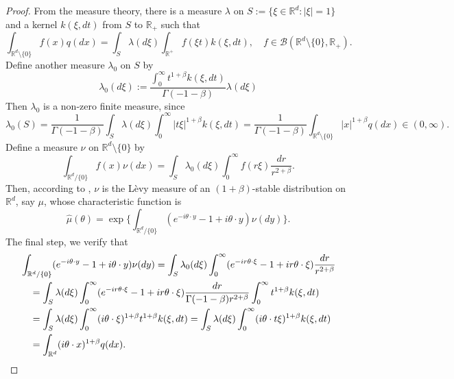 \documentclass[12pt]{amsart}
\theoremstyle{plain}
\theoremstyle{definition}
\numberwithin{equation}{section}
\begin{document}
\begin{proof}
    From the measure theory, there is a measure $\lambda$ on $S:= \{\xi\in \mathbb R^d:|\xi| = 1\}$ and a kernel $k(\xi,dt)$ from $S$ to $\mathbb R_+$ such that
\[
    \int_{\mathbb R^d\setminus \{0\}} f(x)q(dx) = \int_S \lambda(d\xi) \int_{\mathbb R^+} f(\xi t)k(\xi,dt),\quad
    f\in \mathcal B(\mathbb R^d\setminus \{0\}, \mathbb R_+).
\]
    Define another measure $\lambda_0$ on $S$ by
\[
    \lambda_0(d\xi) := \frac{\int_0^\infty t^{1+\beta}k(\xi,dt)}{\Gamma(-1-\beta)} \lambda (d\xi)
\]
    Then $\lambda_0$ is a non-zero finite measure, since
\[
    \lambda_0(S) = \frac{1}{\Gamma(-1-\beta)} \int_S \lambda (d\xi) \int_0^\infty |t\xi|^{1+\beta}k(\xi,dt)
    = \frac{1}{\Gamma(-1-\beta)} \int_{\mathbb R^d\setminus\{0\}} |x|^{1+\beta} q(dx) \in (0,\infty).
\]
    Define a measure $\nu$ on $\mathbb R^d\setminus\{0\}$ by
\[
    \int_{\mathbb R^d/\{0\}}f(x)\nu(dx)= \int_{S} \lambda_0(d\xi) \int_0^\infty f(r\xi) \frac{dr}{r^{2+\beta}} .
\]
    Then, according to \cite[Remark 14.4]{Sato1999Levy}, $\nu$ is the L\`evy measure of an $(1+\beta)$-stable distribution on $\mathbb R^d$, say $\mu$, whose characteristic function is \[\hat \mu(\theta)=\exp\Big\{\int_{\mathbb R^d/\{0\}} (e^{-i\theta \cdot y}-1+i\theta \cdot y) \nu(dy)\Big\}.\]
    The final step, we verify that
\begin{align}
    &\int_{\mathbb R^d/\{0\}} (e^{-i\theta \cdot y}-1+i\theta \cdot y) \nu(dy)
    = \int_S \lambda_0(d\xi) \int_0^\infty (e^{-ir\theta \cdot \xi}-1+ir\theta \cdot \xi) \frac{dr}{r^{2+\beta}}
\\&\quad = \int_S \lambda (d\xi) \int_0^\infty (e^{-ir\theta \cdot \xi}-1+ir\theta \cdot \xi) \frac{dr}{\Gamma(-1-\beta)r^{2+\beta}}\int_0^\infty t^{1+\beta} k(\xi,dt)
\\&\quad = \int_S \lambda (d\xi) \int_0^\infty (i\theta\cdot \xi)^{1+\beta} t^{1+\beta} k(\xi,dt)
= \int_S \lambda(d\xi) \int_0^\infty (i\theta \cdot t\xi)^{1+\beta} k(\xi,dt)
\\&\quad = \int_{\mathbb R^d} (i\theta \cdot x)^{1+\beta} q(dx).
\qedhere
\end{align}
\end{proof}
\end{document}
